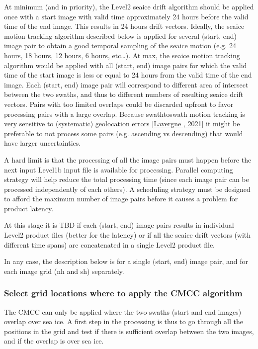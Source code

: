 \documentclass[letterpaper,10pt,english]{jupyterBook}
\begin{document}
\sphinxAtStartPar
At minimum (and in priority), the Level\sphinxhyphen{}2 sea\sphinxhyphen{}ice drift algorithm should be applied once with a start image with valid time approximately 24 hours before the valid time of the end image. This results in 24 hours drift vectors.
Ideally, the sea\sphinxhyphen{}ice motion tracking algorithm described below is applied for several (start, end) image pair to obtain a good temporal sampling of the sea\sphinxhyphen{}ice motion (e.g. 24 hours, 18 hours, 12 hours, 6 hours, etc…). At max,
the sea\sphinxhyphen{}ice motion tracking algorithm would be applied with all (start, end) image pairs for which the valid time of the start image is less or equal to 24 hours from the valid time of the end image. Each (start, end) image pair
will correspond to different area of intersect between the two swaths, and thus to different numbers of resulting sea\sphinxhyphen{}ice drift vectors. Pairs with too limited overlaps could be discarded up\sphinxhyphen{}front to favor processing pairs
with a large overlap. Because swath\sphinxhyphen{}to\sphinxhyphen{}swath motion tracking is very sensitive to (systematic) geolocation errors {[}\hyperlink{cite.references:id20}{Lavergne , 2021}{]} it might be preferable to not process some pairs (e.g. ascending vs descending) that
would have larger uncertainties.

\sphinxAtStartPar
A hard limit is that the processing of all the image pairs must happen before the next input Level\sphinxhyphen{}1b input file is available for processing. Parallel computing strategy will help reduce the
total processing time (since each image pair can be processed independently of each others). A scheduling strategy must be designed to afford the maximum number of image pairs before it causes a problem for product latency.

\sphinxAtStartPar
At this stage it is TBD if each (start, end) image pairs results in individual Level\sphinxhyphen{}2 product files (better for the latency) or if all the sea\sphinxhyphen{}ice drift vectors (with different time spans) are concatenated in a single
Level\sphinxhyphen{}2 product file.

\sphinxAtStartPar
In any case, the description below is for a single (start, end) image pair, and for each image grid (nh and sh) separately.


\subsubsection{Select grid locations where to apply the CMCC algorithm}
\label{\detokenize{baseline_algorithm_definition:select-grid-locations-where-to-apply-the-cmcc-algorithm}}
\sphinxAtStartPar
The CMCC can only be applied where the two swaths (start and end images) overlap over sea ice. A first step in the processing is thus to go through all the positions in the  grid and test if
there is sufficient overlap between the two images, and if the overlap is over sea ice.
\end{document}
